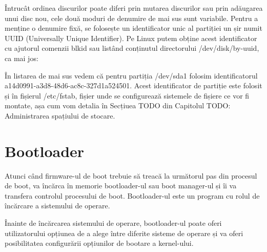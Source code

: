 Întrucât ordinea discurilor poate diferi prin mutarea discurilor sau prin
adăugarea unui disc nou, cele două moduri de denumire de mai sus sunt variabile.
Pentru a menține o denumire fixă, se folosește un identificator unic al
partiției un șir numit UUID 
(Universally Unique Identifier). Pe Linux putem obține acest identificator cu
ajutorul comenzii blkid sau listând conținutul directorului /dev/disk/by-uuid,
ca mai jos:


În listarea de mai sus vedem că pentru partiția /dev/sda1 folosim
identificatorul a14d0991-a3d8-48d6-ac8c-327d1a524501. Acest identificator de
partiție este folosit și în fișierul /etc/fstab, fișier unde se configurează
sistemele de fișiere ce vor fi montate, așa cum vom detalia în Secțiuea TODO din
Capitolul TODO: Administrarea spațiului de stocare.

\section{Bootloader}
\label{sec:boot-bootloader}

Atunci când firmware-ul de boot trebuie să treacă la următorul pas din procesul
de boot, va încărca în memorie bootloader-ul sau boot manager-ul și îi va
transfera controlul procesului de boot. Bootloader-ul este un program cu rolul
de încărcare a sistemului de operare.

Înainte de încărcarea sistemului de operare, bootloader-ul poate oferi
utilizatorului opțiunea de a alege între diferite sisteme de operare și va oferi
posibilitatea configurării opțiunilor de bootare a kernel-ului.

